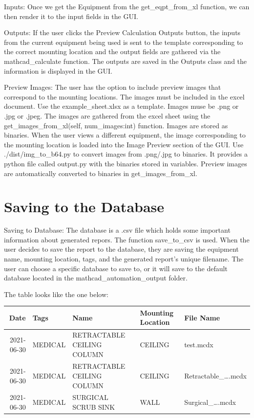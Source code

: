 \documentclass[11pt]{article}
\begin{document}
Inputs: Once we get the Equipment from the get\_eqpt\_from\_xl function, we can then render it to the input fields in the GUI.

Outputs: If the user clicks the Preview Calculation Outputs button, the inputs from the current equipment being used is sent to the template corresponding to the correct mounting location and the output fields are gathered via the mathcad\_calculate function. The outputs are saved in the Outputs class and the information is displayed in the GUI.

Preview Images: The user has the option to include preview images that correspond to the mounting locations. The images must be included in the excel document. Use the example\_sheet.xlsx as a template. Images muse be .png or .jpg or .jpeg. The images are gathered from the excel sheet using the get\_images\_from\_xl(self, num\_images:int) function. Images are stored as binaries. When the user views a different equipment, the image corresponding to the mounting location is loaded into the Image Preview section of the GUI. Use ./dist/img\_to\_b64.py to convert images from .png/.jpg to binaries. It provides a python file called output.py with the binaries stored in variables. Preview images are automatically converted to binaries in get\_images\_from\_xl.

\section{Saving to the Database}
\label{sec:org8ea2cb7}

Saving to Database: The database is a .csv file which holds some important information about generated repors. The function save\_to\_csv is used. When the user decides to save the report to the database, they are saving the equipment name, mounting location, tags, and the generated report's unique filename. The user can choose a specific database to save to, or it will save to the default database located in the mathcad\_automation\_output folder.

The table looks like the one below:
\begin{center}
\begin{tabular}{rllll}
\hline
Date & Tags & Name & Mounting Location & File Name\\
\hline
2021-06-30 & MEDICAL & RETRACTABLE CEILING COLUMN & CEILING & test.mcdx\\
2021-06-30 & MEDICAL & RETRACTABLE CEILING COLUMN & CEILING & Retractable\_\ldots{}.mcdx\\
2021-06-30 & MEDICAL & SURGICAL SCRUB SINK & WALL & Surgical\_\ldots{}.mcdx\\
\hline
\end{tabular}
\end{center}
\end{document}
